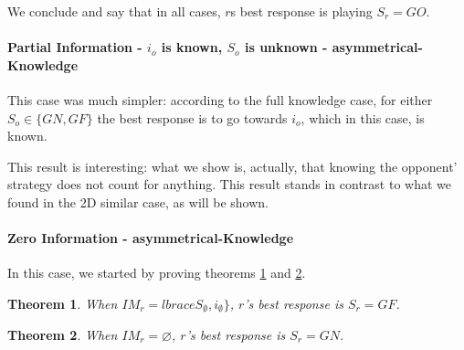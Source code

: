 \documentclass[a4paper,english,10pt]{article}
\newtheorem{theorem}{Theorem}[section]
\newcommand\rob{\ensuremath{r}\xspace}
\newcommand\opp{\ensuremath{o}\xspace}
\newcommand{\gn}{\ensuremath{GN}\xspace}
\newcommand{\gf}{\ensuremath{GF}\xspace}
\newcommand{\go}{\ensuremath{GO}\xspace}
\begin{document}
We conclude and say that in all cases, {\rob}s best response is playing $S_\rob=\go$.





\paragraph{Partial Information - $i_\opp$ is known, $S_\opp$ is unknown - asymmetrical-Knowledge}
This case was much simpler: according to the full knowledge case, for either $S_\opp \in \lbrace \gn,\gf \rbrace$ the best response is to go towards $i_\opp$, which in this case, is known.

This result is interesting: what we show is, actually, that knowing the opponent' strategy does not count for anything. This result stands in contrast to what we found in the 2D similar case, as will be shown.

\paragraph{Zero Information - asymmetrical-Knowledge}
In this case, we started by proving theorems \ref{theorems: 1D no info basic} and \ref{theorems: 1D not info not recognize}.
\begin{theorem} \label{theorems: 1D no info basic}
When $IM_\rob=lbrace S_\emptyset, i_\emptyset \rbrace$, \rob's best response is $S_\rob = \gf$.
\end{theorem}
\begin{theorem} \label{theorems: 1D not info not recognize}
When $IM_\rob=\varnothing$, \rob's best response is $S_\rob = \gn$.
\end{theorem}
\end{document}
